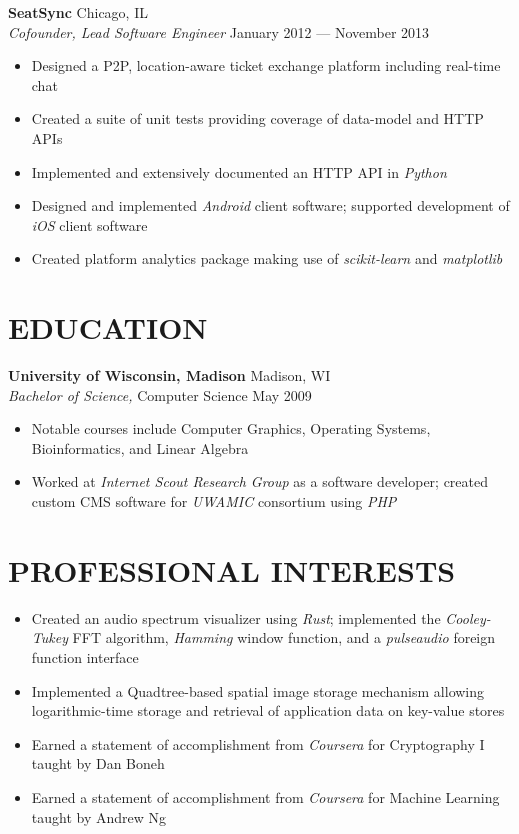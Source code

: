 \documentclass[line,margin]{res}
\begin{document}
\begin{resume}
    \textbf{SeatSync} \hfill Chicago, IL \\
    \textit{Cofounder, Lead Software Engineer}
        \hfill January 2012 --- November 2013
        \begin{itemize}  \itemsep -2pt
            \item Designed a P2P, location-aware ticket exchange platform
                including real-time chat
            \item Created a suite of unit tests providing coverage of
                data-model and HTTP APIs
            \item Implemented and extensively documented an HTTP API in
                \textit{Python}
            \item Designed and implemented \textit{Android} client software;
                supported development of \textit{iOS} client software
            \item Created platform analytics package making use of
                \textit{scikit-learn} and \textit{matplotlib}
        \end{itemize}


\section{EDUCATION}
    \textbf{University of Wisconsin, Madison}  \hfill Madison, WI \\
    \textit{Bachelor of Science,} Computer Science  \hfill May 2009
        \begin{itemize} \itemsep -2pt
            \item Notable courses include Computer Graphics, Operating Systems,
                Bioinformatics, and Linear Algebra
            \item Worked at \textit{Internet Scout Research Group} as a
                software developer; created custom CMS software for
                \textit{UWAMIC} consortium using \textit{PHP}
        \end{itemize}


\section{PROFESSIONAL INTERESTS}
    \begin{itemize} \itemsep -2pt
        \item Created an audio spectrum visualizer using \textit{Rust};
            implemented the \textit{Cooley-Tukey} FFT algorithm,
            \textit{Hamming} window function, and a \textit{pulseaudio} foreign
            function interface
        \item Implemented a Quadtree-based spatial image storage mechanism
            allowing logarithmic-time storage and retrieval of application data
            on key-value stores
        \item Earned a statement of accomplishment from \textit{Coursera} for
            Cryptography I taught by Dan Boneh
        \item Earned a statement of accomplishment from \textit{Coursera} for
            Machine Learning taught by Andrew Ng
    \end{itemize}


\end{resume}
\end{document}
